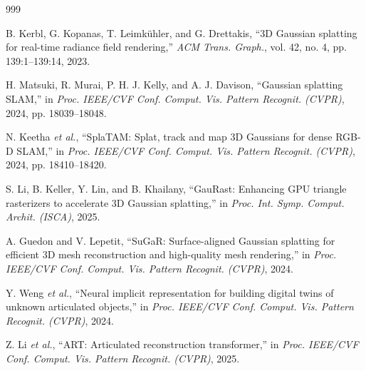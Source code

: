 \documentclass[12pt,a4paper,oneside]{report}
\begin{document}
\begin{thebibliography}{999}


B. Kerbl, G. Kopanas, T. Leimk\"{u}hler, and G. Drettakis, ``{3D} Gaussian splatting for real-time radiance field rendering,'' \textit{ACM Trans. Graph.}, vol. 42, no. 4, pp. 139:1--139:14, 2023.




H. Matsuki, R. Murai, P. H. J. Kelly, and A. J. Davison, ``Gaussian splatting {SLAM},'' in \textit{Proc. IEEE/CVF Conf. Comput. Vis. Pattern Recognit. (CVPR)}, 2024, pp. 18039--18048.




N. Keetha \textit{et al.}, ``{SplaTAM}: Splat, track and map {3D} Gaussians for dense {RGB-D SLAM},'' in \textit{Proc. IEEE/CVF Conf. Comput. Vis. Pattern Recognit. (CVPR)}, 2024, pp. 18410--18420.




S. Li, B. Keller, Y. Lin, and B. Khailany, ``{GauRast}: Enhancing {GPU} triangle rasterizers to accelerate {3D} Gaussian splatting,'' in \textit{Proc. Int. Symp. Comput. Archit. (ISCA)}, 2025.




A. Guedon and V. Lepetit, ``{SuGaR}: Surface-aligned {Gaussian} splatting for efficient {3D} mesh reconstruction and high-quality mesh rendering,'' in \textit{Proc. IEEE/CVF Conf. Comput. Vis. Pattern Recognit. (CVPR)}, 2024.





Y. Weng \textit{et al.}, ``Neural implicit representation for building digital twins of unknown articulated objects,'' in \textit{Proc. IEEE/CVF Conf. Comput. Vis. Pattern Recognit. (CVPR)}, 2024.




Z. Li \textit{et al.}, ``{ART}: Articulated reconstruction transformer,'' in \textit{Proc. IEEE/CVF Conf. Comput. Vis. Pattern Recognit. (CVPR)}, 2025.





\end{thebibliography}
\end{document}
